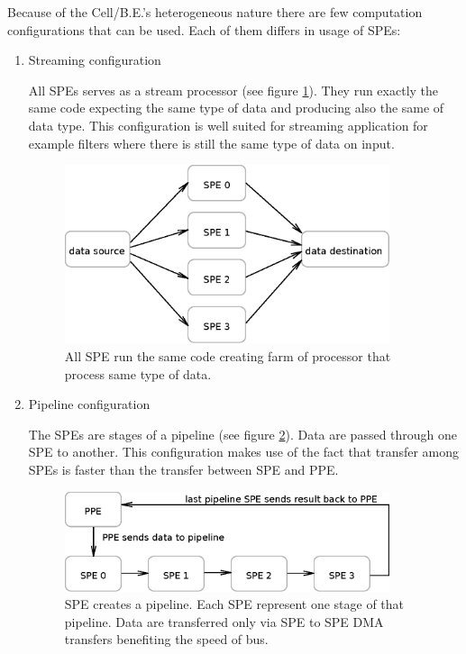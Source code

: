 \par
Because of the \mbox{Cell/B.E.}'s heterogeneous nature there are few computation configurations that can be used.
Each of them differs in usage of SPEs:
\begin{enumerate}
\item Streaming configuration
\par
All SPEs serves as a stream processor (see figure \ref{fg:streamingModel}).
They run exactly the same code expecting the same type of data and producing also the same of data type.
This configuration is well suited for streaming application for example filters where there is still the same type of data on input.

\begin{figure}
    \centering
    \includegraphics[width=0.9\textwidth]{data/streamingModel}
    \caption[Streaming SPE configuration]{All SPE run the same code creating farm of processor that process same type of data.}
    \label{fg:streamingModel}
\end{figure}

\item Pipeline configuration
\par
The SPEs are stages of a pipeline (see figure \ref{fg:pipelineModel}).
Data are passed through one SPE to another.
This configuration makes use of the fact that transfer among SPEs is faster than the transfer between SPE and PPE.

\begin{figure}
    \centering
    \includegraphics[width=0.9\textwidth]{data/pipelineModel}
    \caption[Pipeline SPE configuration]{SPE creates a pipeline. Each SPE represent one stage of that pipeline. Data are transferred only via SPE to SPE DMA transfers benefiting the speed of bus.}
    \label{fg:pipelineModel}
\end{figure}


\end{enumerate}
